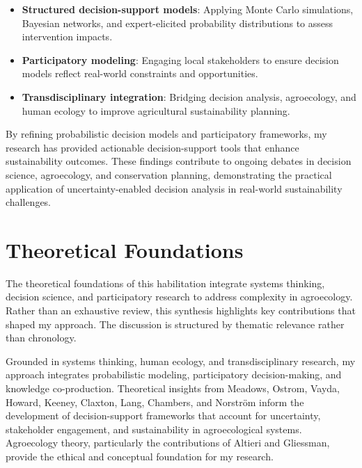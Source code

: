 \documentclass[
]{article}
\begin{document}
\begin{itemize}
\item
  \textbf{Structured decision-support models}: Applying Monte Carlo
  simulations, Bayesian networks, and expert-elicited probability
  distributions to assess intervention impacts.
\item
  \textbf{Participatory modeling}: Engaging local stakeholders to ensure
  decision models reflect real-world constraints and opportunities.
\item
  \textbf{Transdisciplinary integration}: Bridging decision analysis,
  agroecology, and human ecology to improve agricultural sustainability
  planning.
\end{itemize}

By refining probabilistic decision models and participatory frameworks,
my research has provided actionable decision-support tools that enhance
sustainability outcomes. These findings contribute to ongoing debates in
decision science, agroecology, and conservation planning, demonstrating
the practical application of uncertainty-enabled decision analysis in
real-world sustainability challenges.

\newpage

\hypertarget{theoretical-foundations}{%
\section*{Theoretical Foundations}\label{theoretical-foundations}}

The theoretical foundations of this habilitation integrate systems
thinking, decision science, and participatory research to address
complexity in agroecology. Rather than an exhaustive review, this
synthesis highlights key contributions that shaped my approach. The
discussion is structured by thematic relevance rather than chronology.

Grounded in systems thinking, human ecology, and transdisciplinary
research, my approach integrates probabilistic modeling, participatory
decision-making, and knowledge co-production. Theoretical insights from
Meadows, Ostrom, Vayda, Howard, Keeney, Claxton, Lang, Chambers, and
Norström inform the development of decision-support frameworks that
account for uncertainty, stakeholder engagement, and sustainability in
agroecological systems. Agroecology theory, particularly the
contributions of Altieri and Gliessman, provide the ethical and
conceptual foundation for my research.
\end{document}
